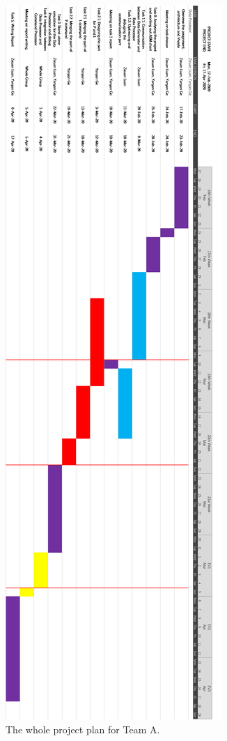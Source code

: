 \documentclass[11pt,a4paper]{report}
\begin{document}
\begin{figure}[!ht]
    \begin{centering}
        \includegraphics[scale=0.31]{TeamA_plan.png}
        \par\end{centering}   
    \caption{The whole project plan for Team A.\label{Team A plan}}
\end{figure}   
\end{document}
